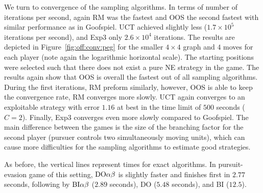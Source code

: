 We turn to convergence of the sampling algorithms.
In terms of number of iterations per second, again RM was the fastest and OOS the second fastest with similar performance as in Goofspiel.
UCT achieved slightly less ($1.7\times10^5$ iterations per second), and Exp3 only $2.6\times10^4$ iterations.
The results are depicted in Figure~\ref{fig:off:conv:peg} for the smaller $4\times4$ graph and $4$ moves for each player (note again the logarithmic horizontal scale).
The starting positions were selected such that there does not exist a pure NE strategy in the game.
The results again show that OOS is overall the fastest out of all sampling algorithms.
During the first iterations, RM preform similarly, however, OOS is able to keep the convergence rate, RM converges more slowly. 
UCT again converges to an exploitable strategy with error $1.16$ at best in the time limit of $500$ seconds ($C=2$).
Finally, Exp3 converges even more slowly compared to Goofspiel.
The main difference between the games is the size of the branching factor for the second player (pursuer controls two simultaneously moving units), which can cause more difficulties for the sampling algorithms to estimate good strategies.

As before, the vertical lines represent times for exact algorithms.
In pursuit-evasion game of this setting, $\textrm{DO}\alpha\beta$ is slightly faster and finishes first in $2.77$ seconds, following by $\textrm{BI}\alpha\beta$ ($2.89$ seconds), \textsc{DO} ($5.48$ seconds), and \textsc{BI} ($12.5$).

